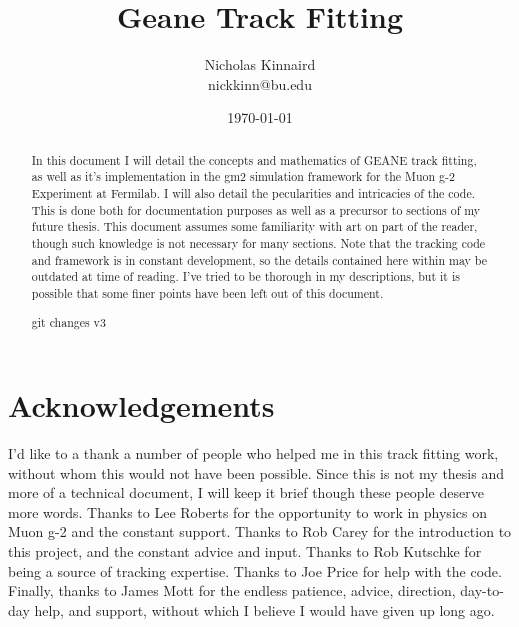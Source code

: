 \documentclass{article}
\begin{document}
\title{Geane Track Fitting}
\author{Nicholas Kinnaird \\ nickkinn@bu.edu}
\date{\today}
\maketitle

\begin{abstract}

    In this document I will detail the concepts and mathematics of GEANE track fitting, as well as it's implementation in the gm2 simulation framework for the Muon g-2 Experiment at Fermilab. I will also detail the pecularities and intricacies of the code. This is done both for documentation purposes as well as a precursor to sections of my future thesis. This document assumes some familiarity with art on part of the reader, though such knowledge is not necessary for many sections. Note that the tracking code and framework is in constant development, so the details contained here within may be outdated at time of reading. I've tried to be thorough in my descriptions, but it is possible that some finer points have been left out of this document.

    git changes v3

\end{abstract}















\printbibliography

\section{Acknowledgements}

	I'd like to a thank a number of people who helped me in this track fitting work, without whom this would not have been possible. Since this is not my thesis and more of a technical document, I will keep it brief though these people deserve more words. Thanks to Lee Roberts for the opportunity to work in physics on Muon g-2 and the constant support. Thanks to Rob Carey for the introduction to this project, and the constant advice and input. Thanks to Rob Kutschke for being a source of tracking expertise. Thanks to Joe Price for help with the code. Finally, thanks to James Mott for the endless patience, advice, direction, day-to-day help, and support, without which I believe I would have given up long ago.




\end{document}
